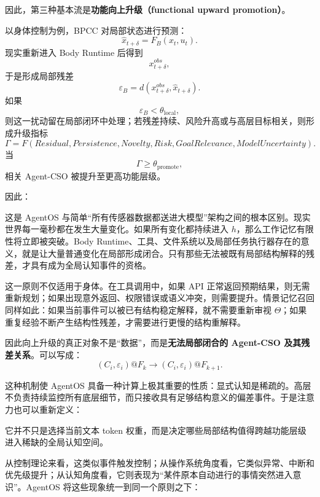 因此，第三种基本流是\textbf{功能向上升级（functional upward promotion）}。

以身体控制为例，BPCC 对局部状态进行预测：
\[
\hat x_{t+\delta}
=
F_B(x_t,u_t).
\]
现实重新进入 Body Runtime 后得到
\[
x^{obs}_{t+\delta},
\]
于是形成局部残差
\[
\varepsilon_B
=
d
\left(
x^{obs}_{t+\delta},
\hat x_{t+\delta}
\right).
\]
如果
\[
\varepsilon_B<\theta_{\mathrm{local}},
\]
则这一扰动留在局部闭环中处理；若残差持续、风险升高或与高层目标相关，则形成升级指标
\[
\Gamma
=
F
\left(
Residual,
Persistence,
Novelty,
Risk,
GoalRelevance,
ModelUncertainty
\right).
\]
当
\[
\Gamma\ge\theta_{\mathrm{promote}},
\]
相关 Agent-CSO 被提升至更高功能层级。

因此：
\begin{statementbox}
\centering
{}
\end{statementbox}

这是 AgentOS 与简单“所有传感器数据都送进大模型”架构之间的根本区别。现实世界每一毫秒都在发生大量变化。如果所有变化都持续进入 $h$，那么工作记忆有限性将立即被突破。Body Runtime、工具、文件系统以及局部任务执行器存在的意义，就是让大量普通变化在局部形成闭合。只有那些无法被既有局部结构解释的残差，才具有成为全局认知事件的资格。

这一原则不仅适用于身体。在工具调用中，如果 API 正常返回预期结果，则无需重新规划；如果出现意外返回、权限错误或语义冲突，则需要提升。情景记忆召回同样如此：如果当前事件可以被已有结构稳定解释，就不需要重新审视 $\Theta$；如果重复经验不断产生结构性残差，才需要进行更慢的结构重解释。

因此向上升级的真正对象不是“数据”，而是\textbf{无法局部闭合的 Agent-CSO 及其残差关系}。可以写成：
\[
(C_i,\varepsilon_i)@F_k
\longrightarrow
(C_i,\varepsilon_i)@F_{k+1}.
\]

这种机制使 AgentOS 具备一种计算上极其重要的性质：显式认知是稀疏的。高层不负责持续监控所有底层细节，而只接收具有足够结构意义的偏差事件。于是注意力也可以重新定义：
\begin{statementbox}
\centering
{}
\end{statementbox}
它并不只是选择当前文本 token 权重，而是决定哪些局部结构值得跨越功能层级进入稀缺的全局认知空间。

从控制理论来看，这类似事件触发控制；从操作系统角度看，它类似异常、中断和优先级提升；从认知角度看，它则表现为“某件原本自动进行的事情突然进入意识”。AgentOS 将这些现象统一到同一个原则之下：
\begin{statementbox}
\centering
{}
\end{statementbox}


